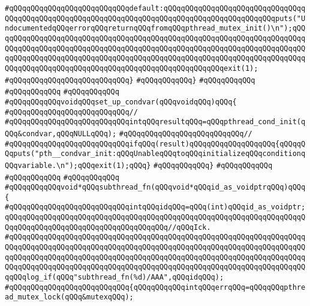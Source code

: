 \verb|#qQQqqQQqqQQqqQQqqQQqqQQqqQQqdefault:qQQqqQQqqQQqqQQqqQQqqQQqqQQqqQQqqQQqqQQqqQQqqQQqqQQqqQQqqQQqqQQqqQQqqQQqqQQqqQQqqQQqqQQqqQQqqQQqputs("UndocumentedqQQqerrorqQQqreturnqQQqfromqQQqpthread_mutex_init()\n");qQQqqQQqqQQqqQQqqQQqqQQqqQQqqQQqqQQqqQQqqQQqqQQqqQQqqQQqqQQqqQQqqQQqqQQqqQQqqQQqqQQqqQQqqQQqqQQqqQQqqQQqqQQqqQQqqQQqqQQqqQQqqQQqqQQqqQQqqQQqqQQqqQQqqQQqqQQqqQQqqQQqqQQqqQQqqQQqqQQqqQQqqQQqqQQqqQQqqQQqqQQqqQQqqQQqqQQqqQQqqQQqqQQqqQQqqQQqqQQqqQQqqQQqqQQqqQQqqQQqqQQqexit(1);|\newline
\verb|#qQQqqQQqqQQqqQQqqQQqqQQqqQQq}|\newline
\verb|#qQQqqQQqqQQq}|\newline
\verb|#qQQqqQQqqQQq|\newline
\verb|#qQQqqQQqqQQq|\newline
\verb|#qQQqqQQqqQQq|\newline
\verb|#qQQqqQQqqQQqvoidqQQqset_up_condvar(qQQqvoidqQQq)qQQq{|\newline
\verb|#qQQqqQQqqQQqqQQqqQQqqQQqqQQq//|\newline
\verb|#qQQqqQQqqQQqqQQqqQQqqQQqqQQqintqQQqresultqQQq=qQQqpthread_cond_init(qQQq&condvar,qQQqNULLqQQq);|\newline
\verb|#qQQqqQQqqQQqqQQqqQQqqQQqqQQq//|\newline
\verb|#qQQqqQQqqQQqqQQqqQQqqQQqqQQqifqQQq(result)qQQqqQQqqQQqqQQqqQQq{qQQqqQQqputs("pth__condvar_init:qQQqUnableqQQqtoqQQqinitializeqQQqconditionqQQqvariable.\n");qQQqexit(1);qQQq}|\newline
\verb|#qQQqqQQqqQQq}|\newline
\verb|#qQQqqQQqqQQq|\newline
\verb|#qQQqqQQqqQQq|\newline
\verb|#qQQqqQQqqQQq|\newline
\verb|#qQQqqQQqqQQqvoid*qQQqsubthread_fn(qQQqvoid*qQQqid_as_voidptrqQQq)qQQq{|\newline
\verb|#qQQqqQQqqQQqqQQqqQQqqQQqqQQqintqQQqidqQQq=qQQq(int)qQQqid_as_voidptr;qQQqqQQqqQQqqQQqqQQqqQQqqQQqqQQqqQQqqQQqqQQqqQQqqQQqqQQqqQQqqQQqqQQqqQQqqQQqqQQqqQQqqQQqqQQqqQQqqQQqqQQqqQQq//qQQqIck.|\newline
\verb|#qQQqqQQqqQQqqQQqqQQqqQQqqQQqqQQqqQQqqQQqqQQqqQQqqQQqqQQqqQQqqQQqqQQqqQQqqQQqqQQqqQQqqQQqqQQqqQQqqQQqqQQqqQQqqQQqqQQqqQQqqQQqqQQqqQQqqQQqqQQqqQQqqQQqqQQqqQQqqQQqqQQqqQQqqQQqqQQqqQQqqQQqqQQqqQQqqQQqqQQqqQQqqQQqqQQqqQQqqQQqqQQqqQQqqQQqqQQqqQQqqQQqqQQqqQQqqQQqqQQqqQQqqQQqqQQqqQQqqQQqqQQqlog_if(qQQq"subthread_fn(%d)/AAA",qQQqidqQQq);|\newline
\verb|#qQQqqQQqqQQqqQQqqQQqqQQqqQQq{qQQqqQQqqQQqintqQQqerrqQQq=qQQqqQQqpthread_mutex_lock(qQQq&mutexqQQq);|\newline
